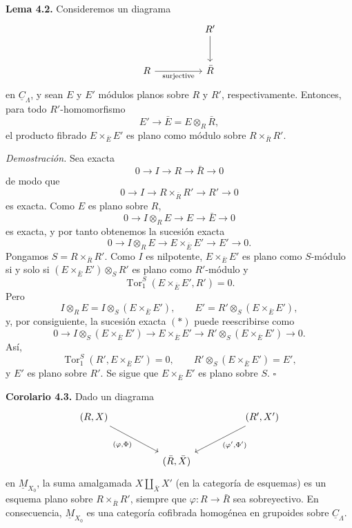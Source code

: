 
\medskip
\noindent\textbf{Lema 4.2.}
Consideremos un diagrama
\[
\begin{tikzcd}[column sep=huge,row sep=large]
& R' \arrow[d] \\
R \arrow[r,"\mathrm{surjective}"'] & \bar R
\end{tikzcd}
\]
en $\underline C_\Lambda$, y sean $E$ y $E'$ módulos planos sobre
$R$ y $R'$, respectivamente. Entonces, para todo
$R'$-homomorfismo
\[
 E'\longrightarrow \bar E=E\otimes_R\bar R,
\]
el producto fibrado $E\times_{\bar E}E'$ es plano como módulo sobre
$R\times_{\bar R}R'$.


\medskip
\noindent\textit{Demostración.}
Sea exacta
\[
 0\longrightarrow I\longrightarrow R\longrightarrow\bar R
 \longrightarrow0
\]
de modo que
\[
 0\longrightarrow I\longrightarrow R\times_{\bar R}R'
 \longrightarrow R'\longrightarrow0
\]
es exacta. Como $E$ es plano sobre $R$,
\[
 0\longrightarrow I\otimes_RE\longrightarrow E
 \longrightarrow\bar E\longrightarrow0
\]
es exacta, y por tanto obtenemos la sucesión exacta
\begin{equation}\tag{*}
0\longrightarrow I\otimes_RE\longrightarrow
E\times_{\bar E}E'\longrightarrow E'\longrightarrow0.
\end{equation}
Pongamos $S=R\times_{\bar R}R'$. Como $I$ es nilpotente,
$E\times_{\bar E}E'$ es plano como $S$-módulo si y solo si
$(E\times_{\bar E}E')\otimes_SR'$ es plano como $R'$-módulo y
\[
 \operatorname{Tor}_1^S(E\times_{\bar E}E',R')=0.
\]
Pero
\[
 I\otimes_RE=I\otimes_S(E\times_{\bar E}E'),
 \qquad
 E'=R'\otimes_S(E\times_{\bar E}E'),
\]
y, por consiguiente, la sucesión exacta $(*)$ puede reescribirse como
\[
0\longrightarrow I\otimes_S(E\times_{\bar E}E')
\longrightarrow E\times_{\bar E}E'
\longrightarrow R'\otimes_S(E\times_{\bar E}E')
\longrightarrow0.
\]
Así,
\[
 \operatorname{Tor}_1^S(R',E\times_{\bar E}E')=0,
 \qquad
 R'\otimes_S(E\times_{\bar E}E')=E',
\]
y $E'$ es plano sobre $R'$. Se sigue que
$E\times_{\bar E}E'$ es plano sobre $S$. \hfill$\square$

\medskip
\noindent\textbf{Corolario 4.3.}
Dado un diagrama
\[
\begin{tikzcd}[column sep=huge,row sep=large]
(R,X) \arrow[dr,"{(\varphi,\Phi)}"']
&& (R',X') \arrow[dl,"{(\varphi',\Phi')}"] \\
& (\bar R,\bar X) &
\end{tikzcd}
\]
en $\underline M_{X_0}$, la suma amalgamada
$X\amalg_{\bar X}X'$ (en la categoría de esquemas) es un esquema
plano sobre $R\times_{\bar R}R'$, siempre que
$\varphi:R\longrightarrow\bar R$ sea sobreyectivo. En consecuencia,
$\underline M_{X_0}$ es una categoría cofibrada homogénea en
grupoides sobre $\underline C_\Lambda$.

